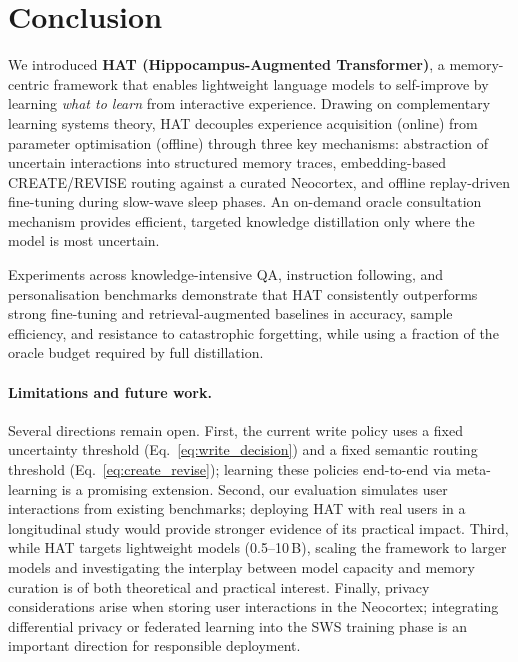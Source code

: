 \section{Conclusion}
\label{sec:conclusion}

We introduced \textbf{HAT (Hippocampus-Augmented Transformer)}, a memory-centric framework that enables lightweight language models to self-improve by learning \emph{what to learn} from interactive experience.
Drawing on complementary learning systems theory, HAT decouples experience acquisition (online) from parameter optimisation (offline) through three key mechanisms: abstraction of uncertain interactions into structured memory traces, embedding-based CREATE/REVISE routing against a curated Neocortex, and offline replay-driven fine-tuning during slow-wave sleep phases.
An on-demand oracle consultation mechanism provides efficient, targeted knowledge distillation only where the model is most uncertain.

Experiments across knowledge-intensive QA, instruction following, and personalisation benchmarks demonstrate that HAT consistently outperforms strong fine-tuning and retrieval-augmented baselines in accuracy, sample efficiency, and resistance to catastrophic forgetting, while using a fraction of the oracle budget required by full distillation.

\paragraph{Limitations and future work.}
Several directions remain open.
First, the current write policy uses a fixed uncertainty threshold (Eq.~\ref{eq:write_decision}) and a fixed semantic routing threshold (Eq.~\ref{eq:create_revise}); learning these policies end-to-end via meta-learning is a promising extension.
Second, our evaluation simulates user interactions from existing benchmarks; deploying HAT with real users in a longitudinal study would provide stronger evidence of its practical impact.
Third, while HAT targets lightweight models (0.5--10\,B), scaling the framework to larger models and investigating the interplay between model capacity and memory curation is of both theoretical and practical interest.
Finally, privacy considerations arise when storing user interactions in the Neocortex; integrating differential privacy or federated learning into the SWS training phase is an important direction for responsible deployment.
